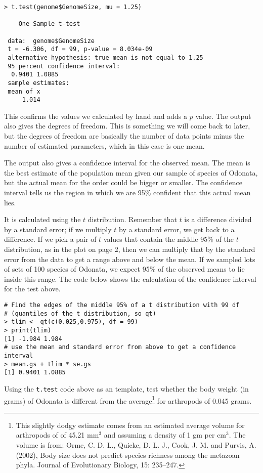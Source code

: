 \begin{lstlisting}
> t.test(genome$GenomeSize, mu = 1.25)
 
	One Sample t-test
 
 data:  genome$GenomeSize 
 t = -6.306, df = 99, p-value = 8.034e-09
 alternative hypothesis: true mean is not equal to 1.25 
 95 percent confidence interval:
  0.9401 1.0885 
 sample estimates:
 mean of x 
     1.014 
\end{lstlisting}

This confirms the values we calculated by hand and adds a $p$ value. 
The output also gives the degrees of freedom. This is something we will 
come back to later, but the degrees of freedom are basically the number 
of data points minus the number of estimated parameters, which in this 
case is one mean.

The output also gives a confidence interval for the observed mean. 
The mean is the best estimate of the population mean given our sample 
of species of Odonata, but the actual mean for the order could be 
bigger or smaller. The confidence interval tells us the region in which 
we are 95\% confident that this actual mean lies.
 
It is calculated using the $t$ distribution. Remember that $t$ is a 
difference divided by a standard error; if we multiply $t$ by a 
standard error, we get back to a difference. If we pick a pair of $t$ 
values that contain the middle 95\% of the $t$ distribution, as in the 
plot on page 2, then we can multiply that by the standard error from 
the data to get a range above and below the mean.  If we sampled lots 
of sets of 100 species of Odonata, we expect 95\% of the observed means 
to lie inside this range. The code below shows the calculation of the 
confidence interval for the test above.

\begin{lstlisting}
# Find the edges of the middle 95% of a t distribution with 99 df
# (quantiles of the t distribution, so qt)
> tlim <- qt(c(0.025,0.975), df = 99)
> print(tlim)
[1] -1.984 1.984
# use the mean and standard error from above to get a confidence interval
> mean.gs + tlim * se.gs
[1] 0.9401 1.0885
\end{lstlisting}

\begin{compactitem}[$\quad\star$]

	\item Using the {\tt t.test} code above as an template, test whether 
	the body weight (in grams) of Odonata is different from the 
	average\footnote{This slightly dodgy estimate comes from an estimated 
	average volume for arthropods of of 45.21 mm$^3$ and assuming a 
	density of 1 gm per cm$^3$. The volume is from: Orme, C. D. L., 
	Quicke, D. L. J., Cook, J. M. and Purvis, A. (2002), Body size does 
	not predict species richness among the metazoan phyla. Journal of 
	Evolutionary Biology, 15: 235--247.} for arthropods of 0.045 grams.

\end{compactitem}	

